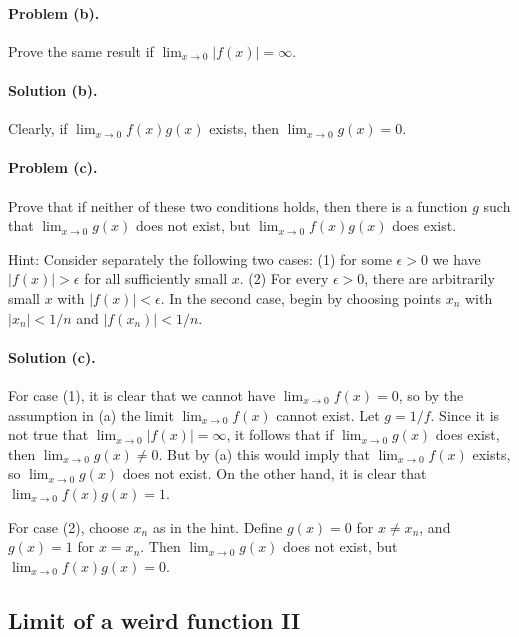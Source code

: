 \documentclass{article}
\begin{document}
\paragraph{Problem (b).} Prove the same result if $\lim_{x \rightarrow 0}|f(x)|
= \infty$.

\paragraph{Solution (b).} Clearly, if $\lim_{x \rightarrow 0}f(x)g(x)$ exists,
then $\lim_{x \rightarrow 0}g(x) = 0$.

\paragraph{Problem (c).} Prove that if neither of these two
conditions holds, then there is a function $g$ such that
$\lim_{x \rightarrow 0}g(x)$ does not exist, but $\lim_{x \rightarrow 0}f(x)
g(x)$ does exist.

Hint: Consider separately the following two cases: (1) for some $\epsilon > 0$
we have $|f(x)| > \epsilon$ for all sufficiently small $x$. (2) For every
$\epsilon > 0$, there are arbitrarily small $x$ with $|f(x)| < \epsilon$. In
the second case, begin by choosing points $x_n$ with $|x_n| < 1/n$ and
$|f(x_n)| < 1/n$.

\paragraph{Solution (c).} For case (1), it is clear that we cannot have
$\lim_{x \rightarrow 0}f(x) = 0$, so by the assumption in (a) the limit
$\lim_{x \rightarrow 0}f(x)$ cannot exist. Let $g = 1/f$. Since it is not true
that $\lim_{x \rightarrow 0}|f(x)| = \infty$, it follows that if $\lim_{x
\rightarrow 0}g(x)$ does exist, then $\lim_{x \rightarrow 0}g(x) \neq 0$. But
by (a) this would imply that $\lim_{x \rightarrow 0}f(x)$ exists, so $\lim_{x
\rightarrow 0}g(x)$ does not exist. On the other hand, it is clear that
$\lim_{x \rightarrow 0}f(x)g(x) = 1$.

For case (2), choose $x_n$ as in the hint. Define $g(x) = 0$ for $x \neq x_n$,
and $g(x) = 1$ for $x = x_n$. Then $\lim_{x \rightarrow 0}g(x)$ does not exist,
but $\lim_{x \rightarrow 0}f(x)g(x) = 0$.

\setcounter{subsection}{23}
\subsection{Limit of a weird function II}
\end{document}
